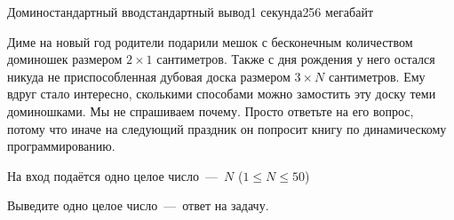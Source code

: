 \begin{problem}{Домино}{стандартный ввод}{стандартный вывод}{1 секунда}{256 мегабайт}

Диме на новый год родители подарили мешок с бесконечным количеством доминошек размером $2 \times 1$ сантиметров. Также с дня рождения у него остался никуда не приспособленная дубовая доска размером $3 \times N$ сантиметров. Ему вдруг стало интересно, сколькими способами можно замостить эту доску теми доминошками. Мы не спрашиваем почему. Просто ответьте на его вопрос, потому что иначе на следующий праздник он попросит книгу по динамическому программированию.

\InputFile
На вход подаётся одно целое число~---~$N$ ($1 \le N \le 50$)

\OutputFile
Выведите одно целое число~---~ответ на задачу.

\Example

\begin{example}
%
\end{example}

\end{problem}


